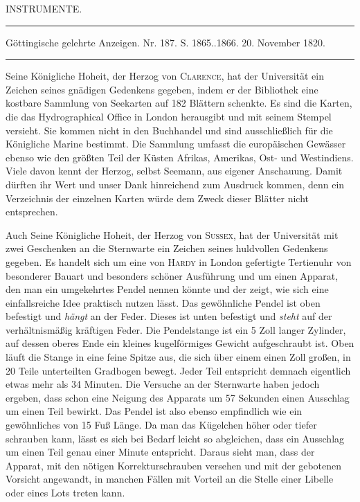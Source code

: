 \clearpage
{}
\begin{center}
{\large INSTRUMENTE.}
\end{center}

\begin{center}
\noindent\rule{\linewidth}{0.4pt}

Göttingische gelehrte Anzeigen. Nr. 187. S. 1865..1866. 20. November 1820.

\noindent\rule{\linewidth}{0.4pt}
\end{center}

Seine Königliche Hoheit, der Herzog von \textsc{Clarence}, hat der Universität ein Zeichen seines gnädigen Gedenkens gegeben, indem er der Bibliothek eine kostbare Sammlung von Seekarten auf 182 Blättern schenkte. Es sind die Karten, die das Hydrographical Office in London herausgibt und mit seinem Stempel versieht. Sie kommen nicht in den Buchhandel und sind ausschließlich für die Königliche Marine bestimmt. Die Sammlung umfasst die europäischen Gewässer ebenso wie den größten Teil der Küsten Afrikas, Amerikas, Ost- und Westindiens. Viele davon kennt der Herzog, selbst Seemann, aus eigener Anschauung. Damit dürften ihr Wert und unser Dank hinreichend zum Ausdruck kommen, denn ein Verzeichnis der einzelnen Karten würde dem Zweck dieser Blätter nicht entsprechen.

Auch Seine Königliche Hoheit, der Herzog von \textsc{Sussex}, hat der Universität mit zwei Geschenken an die Sternwarte ein Zeichen seines huldvollen Gedenkens gegeben. Es handelt sich um eine von \textsc{Hardy} in London gefertigte Tertienuhr von besonderer Bauart und besonders schöner Ausführung und um einen Apparat, den man ein umgekehrtes Pendel nennen könnte und der zeigt, wie sich eine einfallsreiche Idee praktisch nutzen lässt. Das gewöhnliche Pendel ist oben befestigt und \emph{hängt} an der Feder. Dieses ist unten befestigt und \emph{steht} auf der verhältnismäßig kräftigen Feder. Die Pendelstange ist ein 5 Zoll langer Zylinder, auf dessen oberes Ende ein kleines kugelförmiges Gewicht aufgeschraubt ist. Oben läuft die Stange in eine feine Spitze aus, die sich über einem einen Zoll großen, in 20 Teile unterteilten Gradbogen bewegt. Jeder Teil entspricht demnach eigentlich etwas mehr als 34 Minuten. Die Versuche an der Sternwarte haben jedoch ergeben, dass schon eine Neigung des Apparats um 57 Sekunden einen Ausschlag um einen Teil bewirkt. Das Pendel ist also ebenso empfindlich wie ein gewöhnliches von 15 Fuß Länge. Da man das Kügelchen höher oder tiefer schrauben kann, lässt es sich bei Bedarf leicht so abgleichen, dass ein Ausschlag um einen Teil genau einer Minute entspricht. Daraus sieht man, dass der Apparat, mit den nötigen Korrekturschrauben versehen und mit der gebotenen Vorsicht angewandt, in manchen Fällen mit Vorteil an die Stelle einer Libelle oder eines Lots treten kann.

